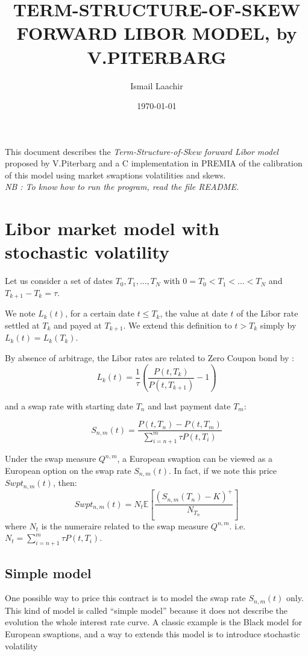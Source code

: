 \documentclass[12pt,a4paper]{article}
\def\E{{\mathbb E}}
\begin{document}
\author{Ismail Laachir}
\title{TERM-STRUCTURE-OF-SKEW FORWARD LIBOR MODEL, by V.PITERBARG}
\date{\today}
\maketitle

\thispagestyle{myheadings}

\tableofcontents

\vspace{10mm}
  
This document describes the \textit{Term-Structure-of-Skew forward Libor model} proposed by V.Piterbarg and a C implementation in PREMIA of the calibration of this model using market swaptions volatilities and skews.\\

\textit{NB : To know how to run the program, read the file README.}

\section{Libor market model with stochastic volatility}

Let us consider a set of dates {$T_0,T_1,...,T_N$} with $0=T_0<T_1< ... <T_N$ and $T_{k+1}-T_{k} = \tau$.

We note $L_k(t)$, for a certain date $t \leq T_k$, the value at date $t$ of the Libor rate settled at $T_k$ and payed at $T_{k+1}$. We extend this definition to $t > T_k$ simply by $L_k(t) = L_k(T_k)$.

By absence of arbitrage, the Libor rates are related to Zero Coupon bond by :
$$L_k(t) = \dfrac{1}{\tau} \left(\dfrac{P(t,T_k)}{P(t,T_{k+1})} - 1\right)$$

and a swap rate with starting date $T_n$ and last payment date $T_m$:

$$S_{n,m}(t) = \dfrac{P(t,T_n)-P(t,T_m)}{\displaystyle\sum_{i=n+1}^{m} \tau P(t,T_i)}$$

Under the swap measure $Q^{n,m}$, a European swaption can be viewed as a European option on the swap rate $S_{n,m}(t)$. In fact, if we note this price $Swpt_{n,m}(t)$, then: 
$$ Swpt_{n,m}(t) = N_t \E\left[ \dfrac{\left( S_{n,m}(T_n) - K\right) ^+}{N_{T_n}}\right] $$ where $N_t$ is the numeraire related to the swap measure $Q^{n,m}$. i.e. $N_t = \displaystyle\sum_{i=n+1}^{m} \tau P(t,T_i)$.

\subsection{Simple model}
One possible way to price this contract is to model the swap rate $S_{n,m}(t)$ only. This kind of model is called ``simple model'' because it does not describe the evolution the whole interest rate curve. A classic example is the Black model for European swaptions, and a way to extends this model is to introduce stochastic volatility
\end{document}
